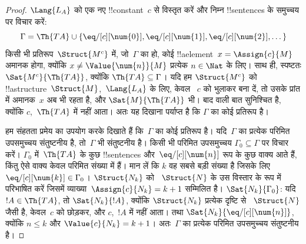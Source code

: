 \documentclass[../../../include/open-logic-section]{subfiles}
\begin{document}
\begin{proof}
$\Lang{L_A}$ को एक नए !!{constant}~$c$ से विस्तृत करें और निम्न
!!{sentence}s के समुच्चय पर विचार करें:
\[
\Gamma = \Th{TA} \cup \{\eq/[c][\num{0}], \eq/[c][\num{1}],
\eq/[c][\num{2}], \dots\}
\]
किसी भी प्रतिरूप~$\Struct{M^c}$ में, जो~$\Gamma$ का हो, कोई
!!a{element}~$x =
\Assign{c}{M}$ अमानक होगा, क्योंकि $x \neq
\Value{\num{n}}{M}$ प्रत्येक $n \in \Nat$ के लिए। साथ ही, स्पष्टतः
$\Sat{M^c}{\Th{TA}}$, क्योंकि $\Th{TA} \subseteq \Gamma$। यदि हम
$\Struct{M^c}$ को !!a{structure}~$\Struct{M}$,~$\Lang{L_A}$ के लिए, केवल
~$c$ को भुलाकर बना दें, तो उसके प्रांत में अमानक~$x$ अब भी
रहता है, और $\Sat{M}{\Th{TA}}$ भी। बाद वाली बात सुनिश्चित है, क्योंकि
$c$,~$\Th{TA}$ में नहीं आता। अतः यह दिखाना पर्याप्त है कि $\Gamma$ का
कोई प्रतिरूप है।

हम संहतता प्रमेय का उपयोग करके दिखाते हैं कि~$\Gamma$ का कोई प्रतिरूप है।
यदि~$\Gamma$ का प्रत्येक परिमित उपसमुच्चय संतुष्टनीय है, तो~$\Gamma$ भी
संतुष्टनीय है। किसी भी परिमित उपसमुच्चय
$\Gamma_0 \subseteq
\Gamma$ पर विचार करें। $\Gamma_0$ में~$\Th{TA}$ के
कुछ !!{sentence}s और~$\eq/[c][\num{n}]$ रूप के कुछ वाक्य आते हैं, किंतु
ऐसे वाक्य केवल परिमित संख्या में हैं। मान लें कि $k$ वह सबसे बड़ी संख्या है
जिसके लिए $\eq/[c][\num{k}] \in \Gamma_0$। $\Struct{N_k}$ को
~$\Struct{N}$ के उस विस्तार के रूप में परिभाषित करें जिसमें
व्याख्या~$\Assign{c}{N_k} = k+1$ सम्मिलित है। $\Sat{N_k}{\Gamma_0}$: यदि
$!A
\in \Th{TA}$, तो $\Sat{N_k}{!A}$, क्योंकि $\Struct{N_k}$ प्रत्येक दृष्टि से
~$\Struct{N}$ जैसी है, केवल~$c$ को छोड़कर, और $c$,~$!A$ में नहीं आता। तथा
$\Sat{N_k}{\eq/[c][\num{n}]}$, क्योंकि $n \le k$ और
$\Value{c}{N_k} = k+1$। अतः~$\Gamma$ का प्रत्येक परिमित उपसमुच्चय
संतुष्टनीय है।
\end{proof}
\end{document}
